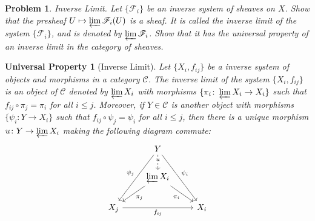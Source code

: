 \documentclass[12pt,letterpaper]{article}
\newtheorem*{universalproperty}{Universal Property}
\newtheorem{problem}{Problem}[section]
\theoremstyle{definition}
\theoremstyle{remark}
\numberwithin{equation}{section}
\numberwithin{figure}{problem}
\begin{document}
\begin{problem}
  \emph{Inverse Limit}. Let $\{\mathscr{F}_i\}$ be an inverse system of sheaves on $X$. Show that the presheaf $U \mapsto \varprojlim \mathscr{F}_i(U)$ is a sheaf. It is called the \emph{inverse limit} of the system $\{\mathscr{F}_i\}$, and is denoted by $\varprojlim \mathscr{F}_i$. Show that it has the universal property of an inverse limit in the category of sheaves.
\end{problem}
\begin{universalproperty}[Inverse Limit]
  Let $\{X_i,f_{ij}\}$ be a inverse system of objects and morphisms in a category $\mathscr{C}$. The \emph{inverse limit} of the system $\{X_i,f_{ij}\}$ is an object of $\mathscr{C}$ denoted by $\varprojlim X_i$ with morphisms $\{\pi_i \colon \varprojlim X_i \to X_i\}$ such that $f_{ij} \circ \pi_j = \pi_i$ for all $i \le j$. Moreover, if $Y \in \mathscr{C}$ is another object with morphisms $\{\psi_i\colon Y \to X_i\}$ such that $f_{ij} \circ \psi_j = \psi_i$ for all $i \le j$, then there is a unique morphism $u\colon Y \to \varprojlim X_i$ making the following diagram commute:
  \begin{equation*}
    \begin{tikzcd}
      {}& Y\arrow[dashed]{d}[description,yshift=3pt]{u}\arrow{ddl}[swap]{\psi_j}\arrow{ddr}{\psi_i}\\
      & \varprojlim X_i\arrow{dl}{\pi_j}\arrow{dr}[swap]{\pi_i}\\
      X_j \arrow{rr}[swap]{f_{ij}} & & X_i
    \end{tikzcd}
  \end{equation*}
\end{universalproperty}
\end{document}
